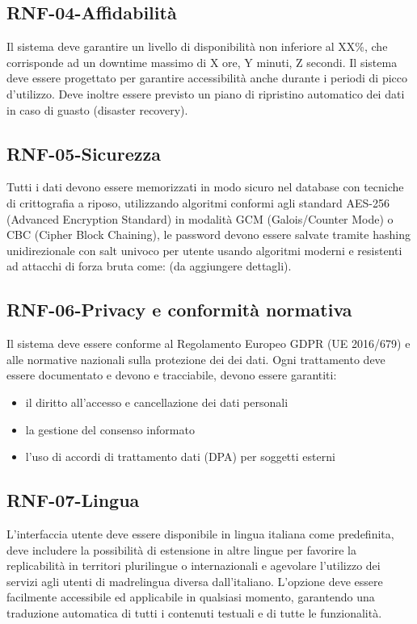 \subsection*{RNF-04-Affidabilità}
Il sistema deve garantire un livello di disponibilità non inferiore al XX\%,
che corrisponde ad un downtime massimo di X ore, Y minuti, Z secondi.
Il sistema deve essere progettato per garantire accessibilità anche durante i
periodi di picco d'utilizzo. Deve inoltre essere previsto un piano di ripristino
automatico dei dati in caso di guasto (disaster recovery).
\subsection*{RNF-05-Sicurezza}
Tutti i dati devono essere memorizzati in modo sicuro nel database con tecniche di
crittografia a riposo, utilizzando algoritmi conformi agli standard AES-256
(Advanced Encryption Standard) in modalità GCM (Galois/Counter Mode)
o CBC (Cipher Block Chaining), le password devono essere salvate tramite hashing
unidirezionale con salt univoco per utente usando algoritmi moderni e
resistenti ad attacchi di forza bruta come: (da aggiungere dettagli).
\subsection*{RNF-06-Privacy e conformità normativa}
Il sistema deve essere conforme al Regolamento Europeo GDPR
(UE 2016/679) e alle normative nazionali sulla protezione dei
dei dati. Ogni trattamento deve essere documentato e devono
e tracciabile, devono essere garantiti:
\begin{itemize}
    \item il diritto all'accesso e cancellazione dei dati personali
    \item la gestione del consenso informato
    \item l'uso di accordi di trattamento dati (DPA) per soggetti esterni
\end{itemize}
\subsection*{RNF-07-Lingua}
L'interfaccia utente deve essere disponibile in lingua italiana
come predefinita, deve includere la possibilità di estensione
in altre lingue per favorire la replicabilità in territori
plurilingue o internazionali e agevolare l'utilizzo dei servizi
agli utenti di madrelingua diversa dall'italiano.
L'opzione deve essere facilmente accessibile ed applicabile in
qualsiasi momento, garantendo una traduzione automatica di tutti i contenuti
testuali e di tutte le funzionalità.

